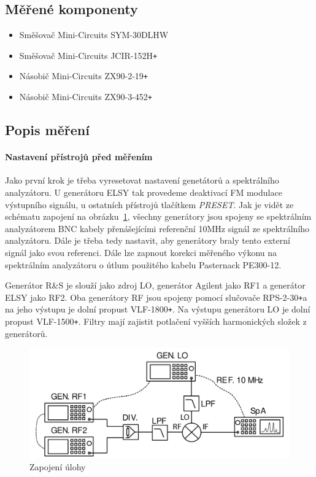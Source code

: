 \documentclass[11pt,a4paper]{article}
\newcommand{\plus}{{\texttt{+}}}
\begin{document}
\subsection*{Měřené komponenty}
\begin{itemize}
    \item Směšovač Mini-Circuits SYM-30DLHW
    \item Směšovač Mini-Circuits JCIR-152H\plus
    \item Násobič Mini-Circuits ZX90-2-19\plus
    \item Násobič Mini-Circuits ZX90-3-452\plus
\end{itemize}

\subsection*{Popis měření}
\paragraph*{Nastavení přístrojů před měřením} Jako první krok je třeba vyresetovat nastavení genetátorů a spektrálního analyzátoru. U generátoru ELSY tak provedeme deaktivací FM modulace výstupního signálu, u ostatních přístrojů tlačítkem \emph{PRESET}. Jak je vidět ze schématu zapojení na obrázku~\ref{fig:task0-zapojeni}, všechny generátory jsou spojeny se spektrálním analyzátorem BNC kabely přenášejícími referenční 10MHz signál ze spektrálního analyzátoru. Dále je třeba tedy nastavit, aby generátory braly tento externí signál jako svou referenci. Dále lze zapnout korekci měřeného výkonu na spektrálním analyzátoru o útlum použitého kabelu Pasternack PE300-12.

Generátor R\&S je slouží jako zdroj LO, generátor Agilent jako RF1 a generátor ELSY jako RF2. Oba generátory RF jsou spojeny pomocí slučovače RPS-2-30\plus a na jeho výstupu je dolní propust VLF-1800\plus. Na výstupu generátoru LO je dolní propust VLF-1500\plus. Filtry mají zajistit potlačení vyšších harmonických složek z generátorů.
\begin{figure}[!ht]
    \centering
    \includegraphics[width=.65\textwidth]{src/task0-zapojeni.png}
    \caption{Zapojení úlohy}
    \label{fig:task0-zapojeni}
\end{figure}
\end{document}
